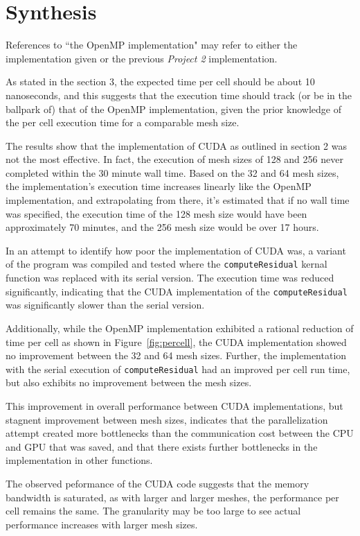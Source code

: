 \documentclass{article}
\begin{document}
  \section{Synthesis}

  References to ``the OpenMP implementation" may refer to either the
  implementation given or the previous \textit{Project 2} implementation.

  As stated in the section 3, the expected time per cell should be about 10
  nanoseconds, and this suggests that the execution time should track (or
  be in the ballpark of) that of the OpenMP implementation, given the
  prior knowledge of the per cell execution time for a comparable mesh size.

  The results show that the implementation of CUDA as outlined in section 2
  was not the most effective. In fact, the execution of mesh sizes of 128 and
  256 never completed within the 30 minute wall time. Based on the 32 and 64
  mesh sizes, the implementation's execution time increases linearly like the
  OpenMP implementation, and extrapolating from there, it's estimated that if
  no wall time was specified, the execution time of the 128 mesh size would
  have been approximately 70 minutes, and the 256 mesh size would be over 17
  hours.

  In an attempt to identify how poor the implementation of CUDA was, a
  variant of the program was compiled and tested where the
  \verb|computeResidual| kernal function was replaced with its serial version.
  The execution time was reduced significantly, indicating that the CUDA
  implementation of the \verb|computeResidual| was significantly slower than
  the serial version.

  Additionally, while the OpenMP implementation exhibited a rational reduction
  of time per cell as shown in Figure~\ref{fig:percell}, the CUDA
  implementation showed no improvement between the 32 and 64 mesh sizes.
  Further, the implementation with the serial execution of 
  \verb|computeResidual| had an improved per cell run time, but also exhibits
  no improvement between the mesh sizes.

  This improvement in overall performance between CUDA implementations, but 
  stagnent improvement between mesh sizes, indicates that the parallelization
  attempt created more bottlenecks than the communication cost between the
  CPU and GPU that was saved, and that there exists further bottlenecks in
  the implementation in other functions.

  The observed peformance of the CUDA code suggests that the memory bandwidth
  is saturated, as with larger and larger meshes, the performance per cell
  remains the same. The granularity may be too large to see actual
  performance increases with larger mesh sizes.
\end{document}
